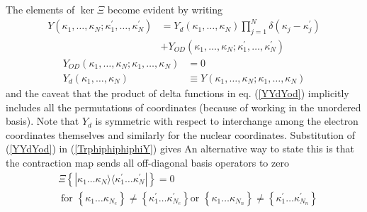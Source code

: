 \documentclass[aps,preprint]{revtex4}%
\begin{document}
The elements of $\ker\Xi$ become evident by writing
\begin{align}
Y(\kappa_{1},\ldots,\kappa_{N};\kappa_{1}^{\prime},\ldots,\kappa_{N}^{\prime
})  &  =Y_{d}(\kappa_{1},\ldots,\kappa_{N})\prod_{j=1}^{N}\delta(\kappa
_{j}-\kappa_{j}^{\prime})\nonumber\\
&  +Y_{OD}(\kappa_{1},\ldots,\kappa_{N};\kappa_{1}^{\prime},\ldots,\kappa
_{N}^{\prime}) \label{YYdYod}%
\end{align}
\begin{align}
Y_{OD}(\kappa_{1},\ldots,\kappa_{N};\kappa_{1},\ldots,\kappa_{N})  &
=0\nonumber\\
Y_{d}(\kappa_{1},\ldots,\kappa_{N})  &  \equiv Y(\kappa_{1},\ldots,\kappa
_{N};\kappa_{1},\ldots,\kappa_{N})
\end{align}
and the caveat that the product of delta functions in eq. (\ref{YYdYod})
implicitly includes all the permutations of coordinates (because of working in
the unordered basis). Note that $Y_{d}$ is symmetric with respect to
interchange among the electron coordinates themselves and similarly for the
nuclear coordinates. Substitution of (\ref{YYdYod}) in (\ref{TrphiphiphiphiY})
gives
An alternative way to state this is that the contraction map sends all
off-diagonal basis operators to zero
\begin{align}
&  \Xi\left\{  |\kappa_{1}\ldots\kappa_{N}\rangle\langle\kappa_{1}^{\prime
}\ldots\kappa_{N}^{\prime}|\right\}  =0\nonumber\\
&  \;\text{{for }}\left\{  \kappa_{1}\ldots\kappa_{N_{e}}\right\}
\neq\left\{  \kappa_{1}^{\prime}\ldots\kappa_{N_{e}}^{\prime}\right\}  \text{
or }\left\{  \kappa_{1}\ldots\kappa_{N_{n}}\right\}  \neq\left\{  \kappa
_{1}^{\prime}\ldots\kappa_{N_{n}}^{\prime}\right\}  \label{zeroeta}%
\end{align}
\end{document}
